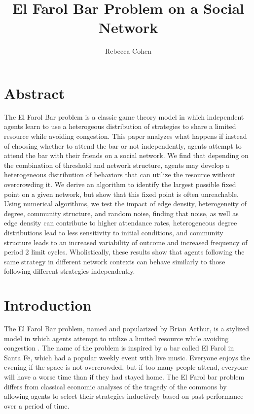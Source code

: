 \documentclass[12pt]{article}
\title{El Farol Bar Problem on a Social Network}
\author{Rebecca Cohen}
\begin{document}
\maketitle
\section{Abstract}
The El Farol Bar problem is a classic game theory model in which independent agents learn to use a heterogeous distribution of strategies to share a limited resource while avoiding congestion.  This paper analyzes what happens if instead of choosing whether to attend the bar or not independently, agents attempt to attend the bar with their friends on a social network.  We find that depending on the combination of threshold and network structure, agents may develop a heterogeneous distribution of behaviors that can utilize the resource without overcrowding it.  We derive an algorithm to identify the largest possible fixed point on a given network, but show that this fixed point is often unreachable.  Using numerical algorithms, we test the impact of edge density, heterogeneity of degree, community structure, and random noise, finding that noise, as well as edge density can contribute to higher attendance rates, heterogeneous degree distributions lead to less sensitivity to initial conditions, and community structure leads to an increased variability of outcome and increased frequency of period 2 limit cycles.  Wholistically, these results show that agents following the same strategy in different network contexts can behave similarly to those following different strategies independently.

\section{Introduction}

The El Farol Bar problem, named and popularized by Brian Arthur, is a stylized model in which agents attempt to utilize a limited resource while avoiding congestion \cite{arthur:1994}.  The name of the problem is inspired by a bar called El Farol in Santa Fe, which had a popular weekly event with live music.  Everyone enjoys the evening if the space is not overcrowded, but if too many people attend, everyone will have a worse time than if they had stayed home.  The El Farol bar problem differs from classical economic analyses of the tragedy of the commons by allowing agents to select their strategies inductively based on past performance over a period of time.
\end{document}
